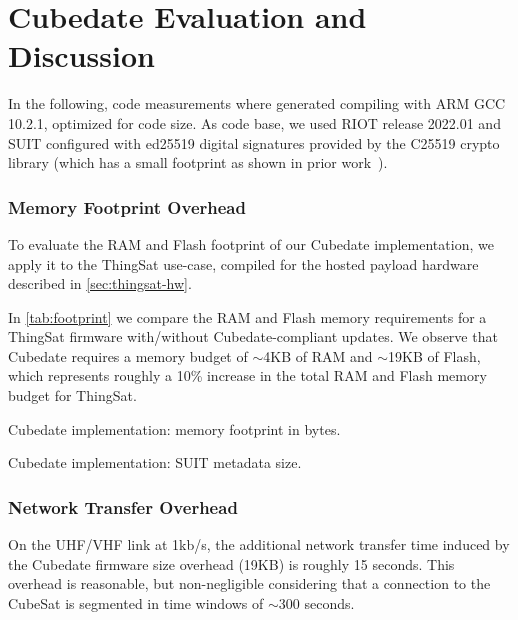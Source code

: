 \section{Cubedate Evaluation and Discussion}
\label{sec:evaluation}

In the following, code measurements where generated compiling with ARM GCC 10.2.1,
optimized for code size. As code base, we used RIOT release 2022.01 and SUIT configured
with ed25519 digital signatures provided by the C25519 crypto library (which has a small
footprint as shown in prior work~\cite{zandberg2019secure}).

\subsubsection{Memory Footprint Overhead}

To evaluate the RAM and Flash footprint of our Cubedate implementation, we apply it to
the ThingSat use-case, compiled for the hosted payload hardware described in \autoref{sec:thingsat-hw}.

In \autoref{tab:footprint} we compare the RAM and Flash memory requirements for a ThingSat firmware with/without Cubedate-compliant updates.
We observe that Cubedate requires a memory budget of $\sim$4KB of RAM and $\sim$19KB of Flash, which represents roughly a 10\%
increase in the total RAM and Flash memory budget for ThingSat.

\begin{table}[h]
\begin{adjustbox}{width=0.8\columnwidth,center}
    \centering
    
\end{adjustbox}
\caption{Cubedate implementation: memory footprint in bytes.}
\label{tab:footprint}
\end{table}

\begin{table}[h]
\begin{adjustbox}{width=\columnwidth,center}
    \centering
    
\end{adjustbox}
\caption{Cubedate implementation: SUIT metadata size.}
\label{tab:manifest}
\end{table}

\subsubsection{Network Transfer Overhead}
On the UHF/VHF link at 1kb/s, the additional network transfer time induced by the Cubedate firmware size overhead (19KB) is roughly 15 seconds.
This overhead is reasonable, but non-negligible considering that a connection to the CubeSat is segmented in time windows of $\sim$300 seconds.

